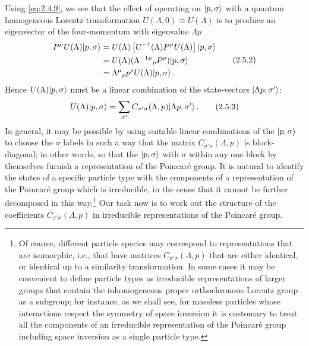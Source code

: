 Using \eqref{eq:2.4.9}, we see that the effect of operating on $\lvert p,\sigma\rangle$ with a
quantum homogeneous Lorentz transformation $U(\Lambda,0)\equiv U(\Lambda)$ is
to produce an eigenvector of the four-momentum with eigenvalue $\Lambda p$
\begin{equation}
\begin{aligned}
P^\mu U(\Lambda)\lvert p,\sigma\rangle
&=U(\Lambda)\left[U^{-1}(\Lambda)P^\mu U(\Lambda)\right]\lvert p,\sigma\rangle\\
&=U(\Lambda)(\Lambda^{-1\mu}{}_{\rho}P^\rho)\lvert p,\sigma\rangle\\
&=\Lambda^\mu{}_{\rho}p^\rho U(\Lambda)\lvert p,\sigma\rangle\,.
\end{aligned}
\tag{2.5.2}\label{eq:2.5.2}
\end{equation}
Hence $U(\Lambda)\lvert p,\sigma\rangle$ must be a linear combination of the
state-vectors $\lvert \Lambda p,\sigma'\rangle$:
\begin{equation}
U(\Lambda)\lvert p,\sigma\rangle
=\sum_{\sigma'}C_{\sigma'\sigma}(\Lambda,p)
\lvert \Lambda p,\sigma'\rangle\,.
\tag{2.5.3}\label{eq:2.5.3}
\end{equation}
In general, it may be possible by using suitable linear combinations of the
$\lvert p,\sigma\rangle$ to choose the $\sigma$ labels in such a way that the matrix
$C_{\sigma'\sigma}(\Lambda,p)$ is block-diagonal; in other words, so that the
$\lvert p,\sigma\rangle$ with $\sigma$ within any one block by themselves furnish a
representation of the Poincar\'e group. It is natural to identify
the states of a specific particle type with the components of a representation
of the Poincar\'e group which is irreducible, in the sense that it
cannot be further decomposed in this way.\footnote{Of course, different
particle species may correspond to representations that are isomorphic, i.e.,
that have matrices $C_{\sigma'\sigma}(\Lambda,p)$ that are either identical, or
identical up to a similarity transformation. In some cases it may be convenient
to define particle types as irreducible representations of larger groups that
contain the inhomogeneous proper orthochronous Lorentz group as a subgroup; for
instance, as we shall see, for massless particles whose interactions respect
the symmetry of space inversion it is customary to treat all the components of
an irreducible representation of the Poincar\'e group including
space inversion as a single particle type.} Our task now is to work out the
structure of the coefficients $C_{\sigma'\sigma}(\Lambda,p)$ in irreducible
representations of the Poincar\'e group.

